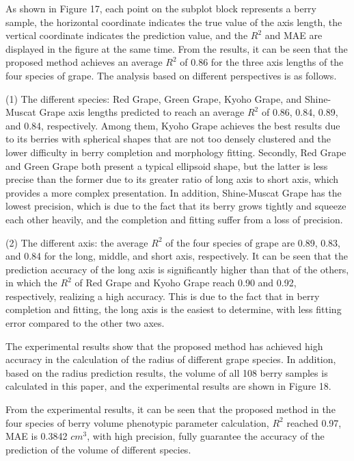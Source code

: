 \documentclass[12pt]{article}
\begin{document}

As shown in Figure 17, each point on the subplot block represents a berry sample, the horizontal coordinate indicates the true value of the axis length, the vertical coordinate indicates the prediction value, and the $R^2$ and MAE are displayed in the figure at the same time. 
From the results, it can be seen that the proposed method achieves an average $R^2$ of 0.86 for the three axis lengths of the four species of grape. 
The analysis based on different perspectives is as follows.

(1) The different species: Red Grape, Green Grape, Kyoho Grape, and Shine-Muscat Grape axis lengths predicted to reach an average $R^2$ of 0.86, 0.84, 0.89, and 0.84, respectively. 
Among them, Kyoho Grape achieves the best results due to its berries with spherical shapes that are not too densely clustered and the lower difficulty in berry completion and morphology fitting. 
Secondly, Red Grape and Green Grape both present a typical ellipsoid shape, but the latter is less precise than the former due to its greater ratio of long axis to short axis, which provides a more complex presentation. 
In addition, Shine-Muscat Grape has the lowest precision, which is due to the fact that its berry grows tightly and squeeze each other heavily, and the completion and fitting suffer from a loss of precision.

(2) The different axis: the average $R^2$ of the four species of grape are 0.89, 0.83, and 0.84 for the long, middle, and short axis, respectively. 
It can be seen that the prediction accuracy of the long axis is significantly higher than that of the others, in which the $R^2$ of Red Grape and Kyoho Grape reach 0.90 and 0.92, respectively, realizing a high accuracy. 
This is due to the fact that in berry completion and fitting, the long axis is the easiest to determine, with less fitting error compared to the other two axes.

The experimental results show that the proposed method has achieved high accuracy in the calculation of the radius of different grape species. 
In addition, based on the radius prediction results, the volume of all 108 berry samples is calculated in this paper, and the experimental results are shown in Figure 18.


From the experimental results, it can be seen that the proposed method in the four species of berry volume phenotypic parameter calculation, $R^2$ reached 0.97, MAE is 0.3842 $cm^3$, with high precision, fully guarantee the accuracy of the prediction of the volume of different species.
\end{document}
